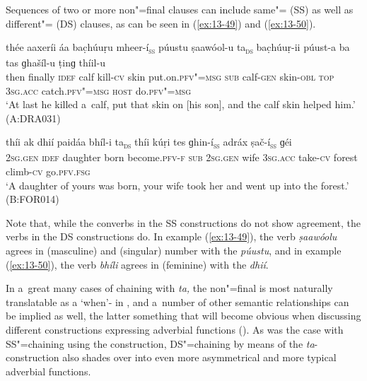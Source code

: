 Sequences of two or more non"=final clauses can include same"= (SS)  as well as different"= (DS) clauses, as can be seen in (\ref{ex:13-49}) and (\ref{ex:13-50}).

\ea
\label{ex:13-49}
\gll thée aaxeríi {\ob}áa bac̣húuṛu mheer-í{\cb}\textsc{\textsubscript{\upshape ss}} {\ob}púustu ṣaawóol-u ta{\cb}\textsc{\textsubscript{\upshape ds}} bac̣húuṛ-ii púust-a ba tas ɡhašíl-u ṭinɡ thíil-u \\
then finally \textsc{idef} calf kill-\textsc{cv}  skin  put.on.\textsc{pfv"=msg} \textsc{sub} calf-\textsc{gen} skin-\textsc{obl} \textsc{top} \textsc{3sg.acc}
catch.\textsc{pfv"=msg} \textsc{host} do.\textsc{pfv"=msg} \\
\glt `At last he killed a~calf, put that skin on [his son], and the calf skin helped him.' (A:DRA031)

\ex
\label{ex:13-50}
\gll {\ob}thíi ak dhií paidáa bhíl-i ta{\cb}\textsc{\textsubscript{\upshape ds}} {\ob}thíi kúṛi tes ɡhin-í{\cb}\textsc{\textsubscript{\upshape ss}} {\ob}adráx ṣač-í{\cb}\textsc{\textsubscript{\upshape ss}} ɡéi \\
\textsc{2sg.gen} \textsc{idef} daughter born become.\textsc{pfv-f} \textsc{sub} \textsc{2sg.gen}  wife \textsc{3sg.acc} take-\textsc{cv} forest climb-\textsc{cv} go.\textsc{pfv.fsg} \\
\glt `A daughter of yours was born, your wife took her and went up into the forest.' (B:FOR014) 
\z

Note that, while the converbs in the SS constructions do not show agreement, the verbs in the DS constructions do. In example (\ref{ex:13-49}), the  verb \textit{ṣaawóolu} agrees in (masculine)  and (singular) number with the  \textit{púustu}, and in example (\ref{ex:13-50}), the verb \textit{bhíli} agrees in (feminine)  with the  \textit{dhií}. 


In a~great many cases of chaining with \textit{ta,} the non"=final  is most naturally translatable as a `when'- in \iliEnglish, and a~number of other semantic relationships can be implied as well, the latter something that will become obvious when discussing different constructions expressing adverbial functions (). As was the case with SS"=chaining using the  construction, DS"=chaining by means of the \textit{ta}-construction also shades over into even more asymmetrical and more typical adverbial functions. 


